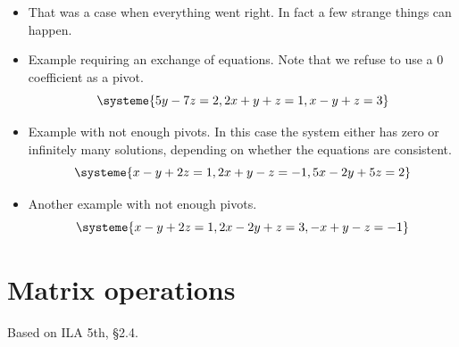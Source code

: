 \documentclass[11pt,oneside]{amsbook}
\theoremstyle{definition}
\theoremstyle{plain}
\theoremstyle{definition}
\theoremstyle{remark}
\numberwithin{equation}{section}
\numberwithin{figure}{section}
\begin{document}
\begin{itemize}
\begin{itemize}
    \[\systeme{2x+4y-2z=2,y+z=4,4z=8}
    \]
  \item We can now back-solve starting with the last variable. The solution is $-1,2,2$.
  \end{itemize}
\item That was a case when everything went right. In fact a few strange things can happen.
\item Example requiring an exchange of equations. Note that we refuse to use a $0$ coefficient as a pivot.
  \[\systeme{5y-7z=2,2x+y+z=1,x-y+z=3}
  \]
\item Example with not enough pivots. In this case the system either has zero or infinitely many solutions, depending on whether the equations are consistent.
  \[\systeme{x-y+2z=1,2x+y-z=-1,5x-2y+5z=2}
  \]
\item Another example with not enough pivots.
  \[\systeme{x-y+2z=1,2x-2y+z=3,-x+y-z=-1}
  \]
\end{itemize}

\newpage
\section{Matrix operations}

Based on ILA 5th, \S 2.4.
\end{document}
